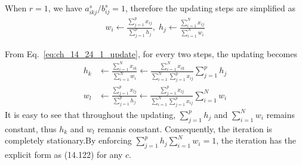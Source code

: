 \begin{exercise}
  \begin{exerciseSection}
    When $r = 1$, we have $a_{ikj}^s/b_{ij}^s = 1$, therefore the updating steps
    are simplified as
    \begin{align}
      w_i \leftarrow \frac{\sum_{j=1}^px_{ij}}{\sum_{j=1}^ph_j}, \; h_j
      \leftarrow \frac{\sum_{i=1}^Nx_{ij}}{\sum_{i=1}^Nw_i}
      \label{eq:ch_14_24_1_update}
    \end{align}
  \end{exerciseSection}
  
  \begin{exerciseSection}
    From Eq.~\eqref{eq:ch_14_24_1_update}, for every two
    steps, the updating becomes
    \begin{align}
      h_k & \leftarrow \frac{\sum_{i=1}^Nx_{ik}}{\sum_{i=1}^Nw_i} \leftarrow
      \frac{\sum_{i=1}^Nx_{ik}} {\sum_{i=1}^N\sum_{j=1}^px_{ij}}
      \sum_{j=1}^ph_j \\
      w_l & \leftarrow \frac{\sum_{j=1}^px_{lj}}{\sum_{j=1}^ph_j} \leftarrow
      \frac{\sum_{j=1}^px_{lj}} {\sum_{i=1}^N\sum_{j=1}^px_{ij}}
      \sum_{i=1}^Nw_i
    \end{align}
    It is easy to see that throughout the updating, $\sum_{j=1}^ph_j$ and
    $\sum_{i=1}^Nw_i$ remains constant, thus $h_k$ and $w_l$ remanis constant.
    Consequently, the iteration is completely stationary.By enforcing
    $\sum_{j=1}^ph_j \sum_{i=1}^Nw_i = 1$, the iteration has the explicit form
    as (14.122) for any $c$.
  \end{exerciseSection}
\end{exercise}

\begin{exercise}[(Program)]
\end{exercise}